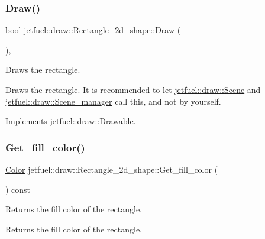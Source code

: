 \subsubsection{\texorpdfstring{Draw()}{Draw()}}
{\footnotesize\ttfamily bool jetfuel\+::draw\+::\+Rectangle\+\_\+2d\+\_\+shape\+::\+Draw (\begin{DoxyParamCaption}{ }\end{DoxyParamCaption})\hspace{0.3cm}{\ttfamily [override]}, {\ttfamily [virtual]}}



Draws the rectangle. 

Draws the rectangle. It is recommended to let \hyperlink{classjetfuel_1_1draw_1_1Scene}{jetfuel\+::draw\+::\+Scene} and \hyperlink{classjetfuel_1_1draw_1_1Scene__manager}{jetfuel\+::draw\+::\+Scene\+\_\+manager} call this, and not by yourself. 

Implements \hyperlink{classjetfuel_1_1draw_1_1Drawable_a1a072070322965ce9411ee6e7c311c56}{jetfuel\+::draw\+::\+Drawable}.

\mbox{\label{classjetfuel_1_1draw_1_1Rectangle__2d__shape_a87340a4dcdcdc3b4d3aa059b5fe4c3af}} 
\subsubsection{\texorpdfstring{Get\+\_\+fill\+\_\+color()}{Get\_fill\_color()}}
{\footnotesize\ttfamily \hyperlink{classjetfuel_1_1draw_1_1Color}{Color} jetfuel\+::draw\+::\+Rectangle\+\_\+2d\+\_\+shape\+::\+Get\+\_\+fill\+\_\+color (\begin{DoxyParamCaption}{ }\end{DoxyParamCaption}) const\hspace{0.3cm}{\ttfamily [inline]}}



Returns the fill color of the rectangle. 

Returns the fill color of the rectangle. \mbox{\label{classjetfuel_1_1draw_1_1Rectangle__2d__shape_a63a682ca90cc17cc993253757296c999}} 

